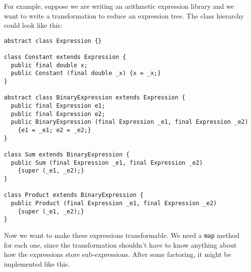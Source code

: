 \documentclass{report}
\begin{document}
      For example, suppose we are writing an arithmetic expression library and we want to write a transformation to reduce an expression tree. The class
      hierarchy could look like this:

\begin{verbatim}
abstract class Expression {}

class Constant extends Expression {
  public final double x;
  public Constant (final double _x) {x = _x;}
}

abstract class BinaryExpression extends Expression {
  public final Expression e1;
  public final Expression e2;
  public BinaryExpression (final Expression _e1, final Expression _e2)
    {e1 = _e1; e2 = _e2;}
}

class Sum extends BinaryExpression {
  public Sum (final Expression _e1, final Expression _e2)
    {super (_e1, _e2);}
}

class Product extends BinaryExpression {
  public Product (final Expression _e1, final Expression _e2)
    {super (_e1, _e2);}
}
\end{verbatim}

      Now we want to make these expressions transformable. We need a {\tt map} method for each one, since the transformation shouldn't have to know anything
      about how the expressions store sub-expressions. After some factoring, it might be implemented like this.
\end{document}
